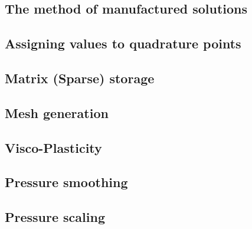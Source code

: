 \documentclass[a4paper]{article}
\begin{document}
\newpage %
\subsection{The method of manufactured solutions}  %

\newpage %
\subsection{Assigning values to quadrature points}  %

\newpage %
\subsection{Matrix (Sparse) storage}  %

\newpage %
\subsection{Mesh generation} \label{subsection_meshes}  %

\newpage %
\subsection{Visco-Plasticity}  %

\newpage %
\subsection{Pressure smoothing}  %

\newpage %
\subsection{Pressure scaling}  %

\newpage %
\end{document}
